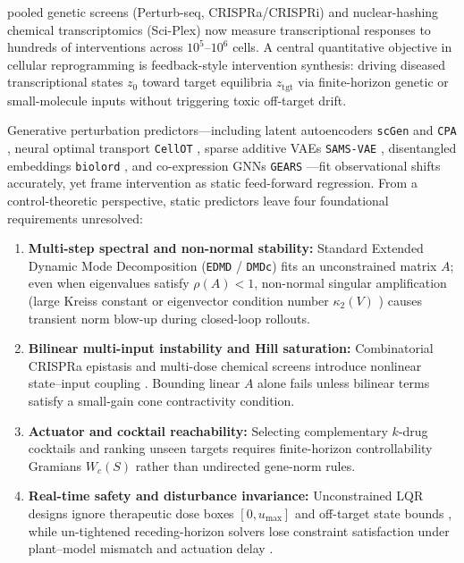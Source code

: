 \documentclass[journal]{IEEEtran}
\begin{document}
 pooled genetic screens (Perturb-seq, CRISPRa/CRISPRi) \cite{dixit2016perturb,adamson2016multiplexed,norman2019exploring} and nuclear-hashing chemical transcriptomics (Sci-Plex) \cite{srivatsan2020massively,peidli2024scperturb} now measure transcriptional responses to hundreds of interventions across $10^5$--$10^6$ cells. A central quantitative objective in cellular reprogramming is feedback-style intervention synthesis: driving diseased transcriptional states $z_0$ toward target equilibria $z_{\mathrm{tgt}}$ via finite-horizon genetic or small-molecule inputs without triggering toxic off-target drift.

Generative perturbation predictors---including latent autoencoders \texttt{scGen} and \texttt{CPA} \cite{lotfollahi2019scgen,lotfollahi2023cpa}, neural optimal transport \texttt{CellOT} \cite{bunne2023cellot}, sparse additive VAEs \texttt{SAMS-\allowbreak VAE} \cite{bereket2023samsvae}, disentangled embeddings \texttt{biolord} \cite{piran2024biolord}, and co-expression GNNs \texttt{GEARS} \cite{roohani2024gears}---fit observational shifts accurately, yet frame intervention as static feed-forward regression. From a control-theoretic perspective, static predictors leave four foundational requirements unresolved:
\begin{enumerate}
  \item \textbf{Multi-step spectral and non-normal stability:} Standard Extended Dynamic Mode Decomposition (\texttt{EDMD} / \texttt{DMDc}) \cite{williams2015edmd,proctor2016dmdc} fits an unconstrained matrix $A$; even when eigenvalues satisfy $\rho(A)<1$, non-normal singular amplification (large Kreiss constant or eigenvector condition number $\kappa_2(V)$ \cite{trefethen2005spectra}) causes transient norm blow-up during closed-loop rollouts.
  \item \textbf{Bilinear multi-input instability and Hill saturation:} Combinatorial CRISPRa epistasis and multi-dose chemical screens introduce nonlinear state--input coupling \cite{bruder2021ral,bruder2021tro}. Bounding linear $A$ alone fails unless bilinear terms satisfy a small-gain cone contractivity condition.
  \item \textbf{Actuator and cocktail reachability:} Selecting complementary $k$-drug cocktails and ranking unseen targets requires finite-horizon controllability Gramians $W_c(S)$ \cite{kalman1963controllability,liu2011controllability,yan2015spectrum,pasqualetti2014controllability,summers2016submodularity} rather than undirected gene-norm rules.
  \item \textbf{Real-time safety and disturbance invariance:} Unconstrained LQR designs ignore therapeutic dose boxes $[0, u_{\max}]$ and off-target state bounds \cite{korda2018linear,mayne2000constrained,rawlings2017model}, while un-tightened receding-horizon solvers lose constraint satisfaction under plant--model mismatch and actuation delay \cite{mayne2005robust}.
\end{enumerate}
\end{document}

